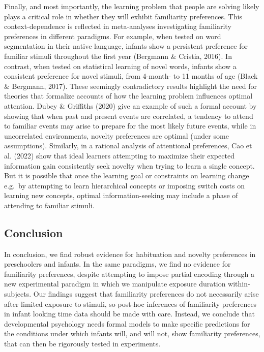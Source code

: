 \documentclass[10pt, letterpaper]{article}
\begin{document}
Finally, and most importantly, the learning problem that people are
solving likely plays a critical role in whether they will exhibit
familiarity preferences. This context-dependence is reflected in
meta-analyses investigating familiarity preferences in different
paradigms. For example, when tested on word segmentation in their native
language, infants show a persistent preference for familiar stimuli
throughout the first year (Bergmann \& Cristia, 2016). In contrast, when
tested on statistical learning of novel words, infants show a consistent
preference for novel stimuli, from 4-month- to 11 months of age (Black
\& Bergmann, 2017). These seemingly contradictory results highlight the
need for theories that formalize accounts of how the learning problem
influences optimal attention. Dubey \& Griffiths (2020) give an example
of such a formal account by showing that when past and present events
are correlated, a tendency to attend to familiar events may arise to
prepare for the most likely future events, while in uncorrelated
environments, novelty preferences are optimal (under some assumptions).
Similarly, in a rational analysis of attentional preferences, Cao et al.
(2022) show that ideal learners attempting to maximize their expected
information gain consistently seek novelty when trying to learn a single
concept. But it is possible that once the learning goal or constraints
on learning change e.g.~by attempting to learn hierarchical concepts or
imposing switch costs on learning new concepts, optimal
information-seeking may include a phase of attending to familiar
stimuli.

\hypertarget{conclusion}{%
\subsection{Conclusion}\label{conclusion}}

In conclusion, we find robust evidence for habituation and novelty
preferences in preschoolers and infants. In the same paradigms, we find
no evidence for familiarity preferences, despite attempting to impose
partial encoding through a new experimental paradigm in which we
manipulate exposure duration within-subjects. Our findings suggest that
familiarity preferences do not necessarily arise after limited exposure
to stimuli, so post-hoc inferences of familiarity preferences in infant
looking time data should be made with care. Instead, we conclude that
developmental psychology needs formal models to make specific
predictions for the conditions under which infants will, and will not,
show familiarity preferences, that can then be rigorously tested in
experiments.
\end{document}
